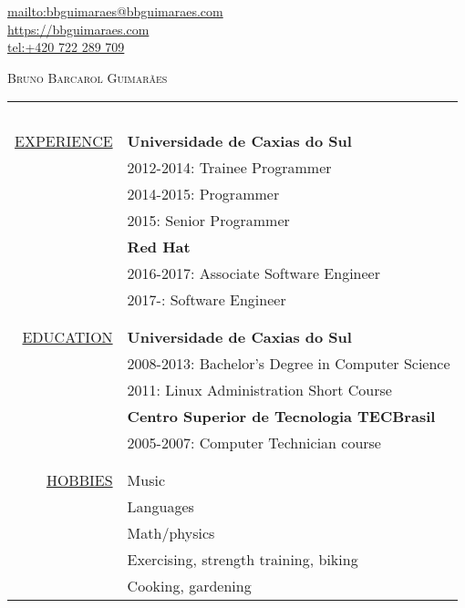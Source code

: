 \begin{flushright}
    \url{mailto:bbguimaraes@bbguimaraes.com} \\
    \url{https://bbguimaraes.com} \\
    \url{tel:+420 722 289 709}
\end{flushright}

\vspace{3\baselineskip}
{\Huge \textsc{Bruno Barcarol Guimarães}} \\
\bigskip

\begin{center}

\begin{tabular}{rl}
    \multicolumn{2}{c}{~\hspace{.95\textwidth}~} \\
    \hspace{5em}
    \hyperref[sec:professional]{\uppercase{Experience}}
    & \textbf{Universidade de Caxias do Sul} \\
    & 2012-2014: Trainee Programmer \\
    & 2014-2015: Programmer \\
    & 2015: Senior Programmer \\
    & \textbf{Red Hat} \\
    & 2016-2017: Associate Software Engineer \\
    & 2017-: Software Engineer
    \\\\ \hline \\
    \hyperref[sec:education]{\uppercase{Education}}
    & \textbf{Universidade de Caxias do Sul} \\
    & 2008-2013: Bachelor's Degree in Computer Science \\
    & 2011: Linux Administration Short Course \\
    & \textbf{Centro Superior de Tecnologia TECBrasil} \\
    & 2005-2007: Computer Technician course \\
    \\ \hline \\
    \hyperref[sec:etc]{\uppercase{Hobbies}}
    & Music \\
    & Languages \\
    & Math/physics \\
    & Exercising, strength training, biking \\
    & Cooking, gardening
\end{tabular}

\end{center}
